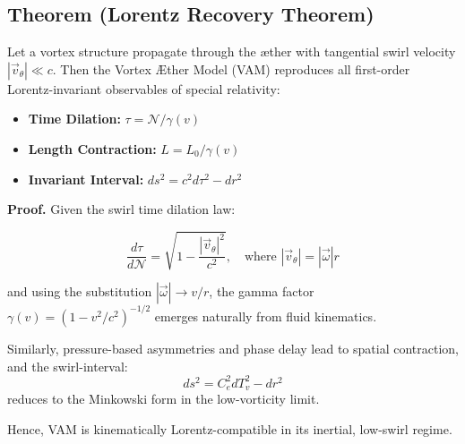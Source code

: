 
    \subsection{Theorem (Lorentz Recovery Theorem)}

    \begin{theorem*}
        Let a vortex structure propagate through the æther with tangential swirl velocity \( |\vec{v}_\theta| \ll c \). Then the Vortex Æther Model (VAM) reproduces all first-order Lorentz-invariant observables of special relativity:

        \begin{itemize}
            \item \textbf{Time Dilation:} \( \tau = \mathcal{N} / \gamma(v) \)
            \item \textbf{Length Contraction:} \( L = L_0 / \gamma(v) \)
            \item \textbf{Invariant Interval:} \( ds^2 = c^2 d\tau^2 - dr^2 \)
        \end{itemize}

        \textbf{Proof.}
        Given the swirl time dilation law:\\

        \begin{eqbox}
            \begin{equation}\label{eq:swirl-dilation}
            \frac{d\tau}{d\mathcal{N}} = \sqrt{1 - \frac{|\vec{v}_\theta|^2}{c^2}}, \quad \text{where } |\vec{v}_\theta| = |\vec{\omega}| r
            \end{equation}
        \end{eqbox}


        and using the substitution \( |\vec{\omega}| \to v/r \), the gamma factor \( \gamma(v) = \left(1 - v^2/c^2\right)^{-1/2} \) emerges naturally from fluid kinematics.

        Similarly, pressure-based asymmetries and phase delay lead to spatial contraction, and the swirl-interval:
        \[
            ds^2 = C_e^2 dT_v^2 - dr^2
        \]
        reduces to the Minkowski form in the low-vorticity limit.

        Hence, VAM is kinematically Lorentz-compatible in its inertial, low-swirl regime.
    \end{theorem*}


